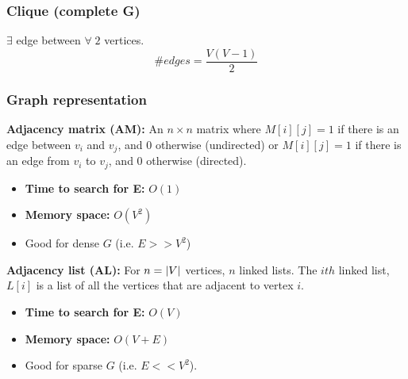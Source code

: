     \subsubsection{Clique (complete G)}
    \begin{definition}
        $\exists$ edge between $\forall \; 2$ vertices. 
        \begin{equation*}
            \# edges = \frac{V(V-1)}{2}
        \end{equation*}
    \end{definition}

    \subsubsection{Graph representation}
    \begin{definition}
        
        \textbf{Adjacency matrix (AM):} An $n\times n$ matrix where $M[i][j]=1$ if there is an edge between $v_i$ and $v_j$, and $0$ otherwise (undirected) or $M[i][j]=1$ if there is an edge from $v_i$ to $v_j$, and $0$ otherwise (directed).
        \begin{itemize}
            \item \textbf{Time to search for E:} $O(1)$
            \item \textbf{Memory space:} $O(V^2)$
            \item Good for dense $G$ (i.e. $E>>V^2$)
        \end{itemize}
        \vspace{1em}

        \textbf{Adjacency list (AL):} For $n=\abs{V}$ vertices, $n$ linked lists. The $ith$ linked list, $L[i]$ is a list of all the vertices that are adjacent to vertex $i$.
        \begin{itemize}
            \item \textbf{Time to search for E:} $O(V)$
            \item \textbf{Memory space:} $O(V+E)$ 
            \item Good for sparse $G$ (i.e. $E<<V^2$).
        \end{itemize}
        \vspace{1em}
    \end{definition}

